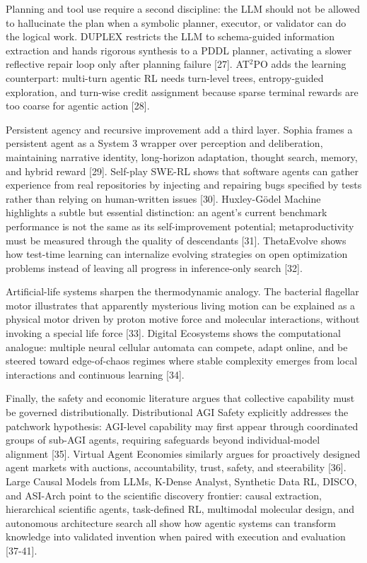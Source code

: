 \documentclass[11pt]{article}
\begin{document}
Planning and tool use require a second discipline: the LLM should not be
allowed to hallucinate the plan when a symbolic planner, executor, or
validator can do the logical work. DUPLEX restricts the LLM to
schema-guided information extraction and hands rigorous synthesis to a
PDDL planner, activating a slower reflective repair loop only after
planning failure {[}27{]}. AT\(^2\)PO adds the learning counterpart:
multi-turn agentic RL needs turn-level trees, entropy-guided
exploration, and turn-wise credit assignment because sparse terminal
rewards are too coarse for agentic action {[}28{]}.

Persistent agency and recursive improvement add a third layer. Sophia
frames a persistent agent as a System 3 wrapper over perception and
deliberation, maintaining narrative identity, long-horizon adaptation,
thought search, memory, and hybrid reward {[}29{]}. Self-play SWE-RL
shows that software agents can gather experience from real repositories
by injecting and repairing bugs specified by tests rather than relying
on human-written issues {[}30{]}. Huxley-Gödel Machine highlights a
subtle but essential distinction: an agent's current benchmark
performance is not the same as its self-improvement potential;
metaproductivity must be measured through the quality of descendants
{[}31{]}. ThetaEvolve shows how test-time learning can internalize
evolving strategies on open optimization problems instead of leaving all
progress in inference-only search {[}32{]}.

Artificial-life systems sharpen the thermodynamic analogy. The bacterial
flagellar motor illustrates that apparently mysterious living motion can
be explained as a physical motor driven by proton motive force and
molecular interactions, without invoking a special life force {[}33{]}.
Digital Ecosystems shows the computational analogue: multiple neural
cellular automata can compete, adapt online, and be steered toward
edge-of-chaos regimes where stable complexity emerges from local
interactions and continuous learning {[}34{]}.

Finally, the safety and economic literature argues that collective
capability must be governed distributionally. Distributional AGI Safety
explicitly addresses the patchwork hypothesis: AGI-level capability may
first appear through coordinated groups of sub-AGI agents, requiring
safeguards beyond individual-model alignment {[}35{]}. Virtual Agent
Economies similarly argues for proactively designed agent markets with
auctions, accountability, trust, safety, and steerability {[}36{]}.
Large Causal Models from LLMs, K-Dense Analyst, Synthetic Data RL,
DISCO, and ASI-Arch point to the scientific discovery frontier: causal
extraction, hierarchical scientific agents, task-defined RL, multimodal
molecular design, and autonomous architecture search all show how
agentic systems can transform knowledge into validated invention when
paired with execution and evaluation {[}37-41{]}.
\end{document}

